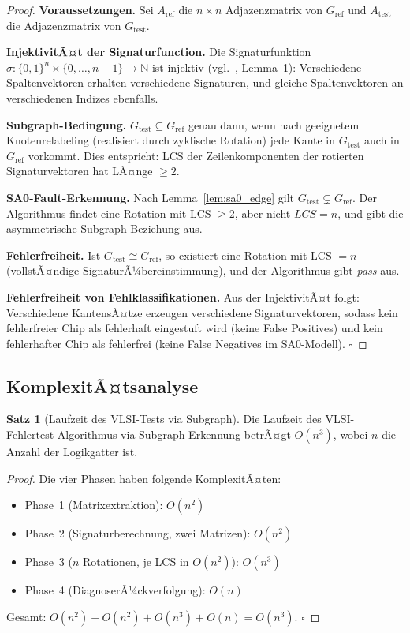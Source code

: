 ﻿\documentclass[a4paper,12pt]{article}
\theoremstyle{definition}
\newtheorem{satz}{Satz}
\begin{document}
\begin{proof}
  \textbf{Voraussetzungen.}
  Sei $A_{\mathrm{ref}}$ die $n \times n$ Adjazenzmatrix von
  $G_{\mathrm{ref}}$ und $A_{\mathrm{test}}$ die Adjazenzmatrix von
  $G_{\mathrm{test}}$.

  \textbf{InjektivitÃ¤t der Signaturfunction.}
  Die Signatur\-funktion
  $\sigma: \{0,1\}^n \times \{0,\ldots,n-1\} \to \mathbb{N}$ ist
  injektiv (vgl.~\cite{epp2026subgraph}, Lemma~1): Verschiedene
  Spaltenvektoren erhalten verschiedene Signaturen, und gleiche
  Spaltenvektoren an verschiedenen Indizes ebenfalls.

  \textbf{Subgraph-Bedingung.}
  $G_{\mathrm{test}} \subseteq G_{\mathrm{ref}}$ genau dann, wenn
  nach geeignetem Knotenrelabeling (realisiert durch zyklische Rotation)
  jede Kante in $G_{\mathrm{test}}$ auch in $G_{\mathrm{ref}}$
  vorkommt. Dies entspricht: LCS der Zeilenkomponenten der rotierten
  Signaturvektoren hat LÃ¤nge $\geq 2$.

  \textbf{SA0-Fault-Erkennung.}
  Nach Lemma~\ref{lem:sa0_edge} gilt
  $G_{\mathrm{test}} \subsetneq G_{\mathrm{ref}}$.
  Der Algorithmus findet eine Rotation mit LCS $\geq 2$, aber nicht
  $LCS = n$, und gibt die asymmetrische Subgraph-Beziehung aus.

  \textbf{Fehlerfreiheit.}
  Ist $G_{\mathrm{test}} \cong G_{\mathrm{ref}}$, so existiert eine
  Rotation mit LCS $= n$ (vollstÃ¤ndige SignaturÃ¼bereinstimmung), und
  der Algorithmus gibt \emph{pass} aus.

  \textbf{Fehlerfreiheit von Fehlklassifikationen.}
  Aus der InjektivitÃ¤t folgt: Verschiedene KantensÃ¤tze erzeugen
  verschiedene Signaturvektoren, sodass kein fehlerfreier Chip als
  fehlerhaft eingestuft wird (keine False Positives) und kein
  fehlerhafter Chip als fehlerfrei (keine False Negatives im
  SA0-Modell). $\square$
\end{proof}

\subsection{KomplexitÃ¤tsanalyse}

\begin{satz}[Laufzeit des VLSI-Tests via Subgraph]
  \label{satz:laufzeit}
  Die Laufzeit des VLSI-Fehlertest-Algorithmus via Subgraph-Erkennung
  betrÃ¤gt $O(n^3)$, wobei $n$ die Anzahl der Logikgatter ist.
\end{satz}

\begin{proof}
  Die vier Phasen haben folgende KomplexitÃ¤ten:
  \begin{itemize}
    \item Phase~1 (Matrixextraktion): $O(n^2)$
    \item Phase~2 (Signaturberechnung, zwei Matrizen): $O(n^2)$
    \item Phase~3 ($n$ Rotationen, je LCS in $O(n^2)$): $O(n^3)$
    \item Phase~4 (DiagnoserÃ¼ckverfolgung): $O(n)$
  \end{itemize}
  Gesamt: $O(n^2) + O(n^2) + O(n^3) + O(n) = O(n^3)$. $\square$
\end{proof}
\end{document}
